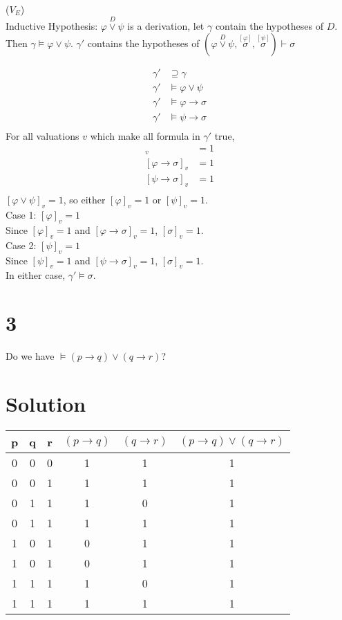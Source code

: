 \documentclass[10pt]{article}
\begin{document}
($V_E$) \\
Inductive Hypothesis: $\overset{D}{\varphi \lor \psi}$ is a derivation, let $\gamma$ contain the hypotheses of $D$. Then $\gamma \models \varphi \lor \psi$.
$\gamma'$ contains the hypotheses of  $(\overset{D}{\varphi \lor \psi}, \overset{[\varphi]}{\sigma}, \overset{[\psi]}{\sigma}) \vdash \sigma$

\begin{align*}
\gamma' &\supseteq \gamma \\
\gamma' &\models \varphi \lor \psi \\
\gamma' &\models \varphi \to \sigma \\
\gamma' &\models \psi \to \sigma \\
\end{align*}
For all valuations $v$ which make all formula in $\gamma'$ true,
 \begin{align*}
[\varphi \lor \psi]_v &=1 \\
[\varphi \to \sigma]_v &=1 \\
[\psi \to \sigma]_v &=1 \\
\end{align*}
$[\varphi \lor \psi]_v =1$,  so either $[\varphi]_v=1$ or $[\psi]_v=1$. \vspace{10pt}\\
Case 1: $[\varphi]_v =1$ \\
Since $[\varphi]_v =1$ and $[\varphi \to \sigma]_v = 1$, $[\sigma]_v=1$.\vspace{10pt}  \\
Case 2: $[\psi]_v =1$ \\
Since $[\psi]_v =1$ and $[\psi \to \sigma]_v = 1$, $[\sigma]_v=1$. \vspace{10pt}\\ In either case,  $\gamma' \models \sigma$.

\section*{3}

Do we have $\models (p \to q) \lor (q\to r)$?

\section*{Solution}


\begin{tabular}{ c | c | c | c | c || c }    
  p & q & r & $(p\to q)$ & $(q\to r)$ & $(p\to q)\lor (q\to r)$\\
  \hline
  0 & 0 & 0 & 1 & 1 & 1\\
  0 & 0 & 1 & 1 & 1 & 1\\
  0 & 1 & 1 & 1 & 0 & 1\\
  0 & 1 & 1 & 1 & 1 & 1\\
  1 & 0 & 1 & 0 & 1 & 1\\
  1 & 0 & 1 & 0 & 1 & 1\\
  1 & 1 & 1 & 1 & 0 & 1\\
  1 & 1 & 1 & 1 & 1 & 1\\
\end{tabular}
\end{document}

